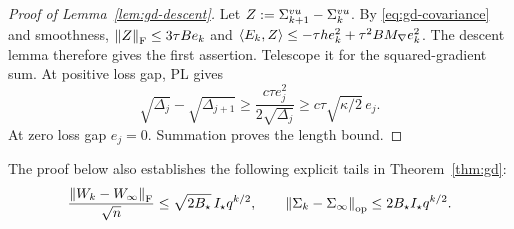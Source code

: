 \begin{proof}[Proof of Lemma~\ref{lem:gd-descent}]
Let $Z:=\Sigma^{vu}_{k+1}-\Sigma^{vu}_k$. By \eqref{eq:gd-covariance} and smoothness,
$\left\lVert Z \right\rVert_{\mathrm{F}}\le3\tau Be_k$ and
$\left\langle E_k,Z \right\rangle\le-\tau h e_k^2+\tau^2BM_{\nabla}e_k^2$.
The descent lemma therefore gives the first assertion. Telescope it for
the squared-gradient sum. At positive loss gap, PL gives
\[
 \sqrt{\Delta_j}-\sqrt{\Delta_{j+1}}
 \ge\frac{c\tau e_j^2}{2\sqrt{\Delta_j}}
 \ge c\tau\sqrt{\kappa/2}\,e_j.
\]
At zero loss gap $e_j=0$. Summation proves the length bound.
\end{proof}

The proof below also establishes the following explicit tails in
Theorem~\ref{thm:gd}:
\begin{equation}\label{eq:gd-tails}
 \frac{\left\lVert W_k-W_\infty \right\rVert_{\mathrm{F}}}{\sqrt n}
 \le\sqrt{2B_\star}\,I_\star q^{k/2},\qquad
 \left\lVert \Sigma_k-\Sigma_\infty \right\rVert_{\mathrm{op}}
 \le2B_\star I_\star q^{k/2}.
\end{equation}

